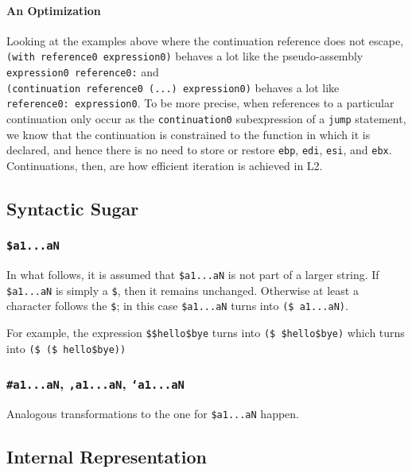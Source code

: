 \documentclass[]{article}
\let\oldparagraph\paragraph
\renewcommand{\paragraph}[1]{\oldparagraph{#1}\mbox{}}
\begin{document}
\hypertarget{an-optimization}{\paragraph{An
Optimization}\label{an-optimization}}

Looking at the examples above where the continuation reference does not
escape, \texttt{(with\ reference0\ expression0)} behaves a lot like the
pseudo-assembly \texttt{expression0\ reference0:} and
\texttt{(continuation\ reference0\ (...)\ expression0)} behaves a lot
like \texttt{reference0:\ expression0}. To be more precise, when
references to a particular continuation only occur as the
\texttt{continuation0} subexpression of a \texttt{jump} statement, we
know that the continuation is constrained to the function in which it is
declared, and hence there is no need to store or restore \texttt{ebp},
\texttt{edi}, \texttt{esi}, and \texttt{ebx}. Continuations, then, are
how efficient iteration is achieved in L2.

\hypertarget{syntactic-sugar}{\subsection{Syntactic
Sugar}\label{syntactic-sugar}}

\subsubsection{\texorpdfstring{\texttt{\$a1...aN}}{\$a1...aN}}\label{a1...an}

In what follows, it is assumed that \texttt{\$a1...aN} is not part of a
larger string. If \texttt{\$a1...aN} is simply a \texttt{\$}, then it
remains unchanged. Otherwise at least a character follows the
\texttt{\$}; in this case \texttt{\$a1...aN} turns into
\texttt{(\$\ a1...aN)}.

For example, the expression \texttt{\$\$hello\$bye} turns into
\texttt{(\$\ \$hello\$bye)} which turns into
\texttt{(\$\ (\$\ hello\$bye))}

\subsubsection{\texorpdfstring{\texttt{\#a1...aN}, \texttt{,a1...aN},
\texttt{`a1...aN}}{\#a1...aN, ,a1...aN, `a1...aN}}\label{a1...an-a1...an-a1...an}

Analogous transformations to the one for \texttt{\$a1...aN} happen.

\hypertarget{internal-representation}{\subsection{Internal
Representation}\label{internal-representation}}
\end{document}
